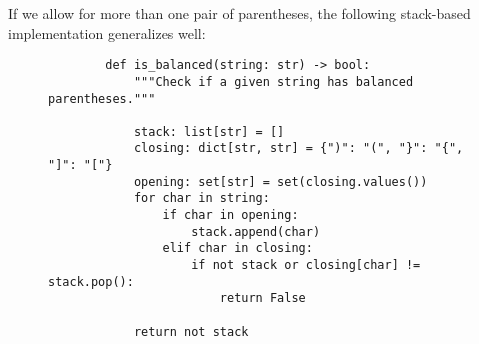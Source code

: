 If we allow for more than one pair of parentheses, the following stack-based
implementation generalizes well:

\begin{figure}[H]
    \centering
    \begin{verbatim}
        def is_balanced(string: str) -> bool:
            """Check if a given string has balanced parentheses."""

            stack: list[str] = []
            closing: dict[str, str] = {")": "(", "}": "{", "]": "["}
            opening: set[str] = set(closing.values())
            for char in string:
                if char in opening:
                    stack.append(char)
                elif char in closing:
                    if not stack or closing[char] != stack.pop():
                        return False

            return not stack
    \end{verbatim}
\end{figure}
